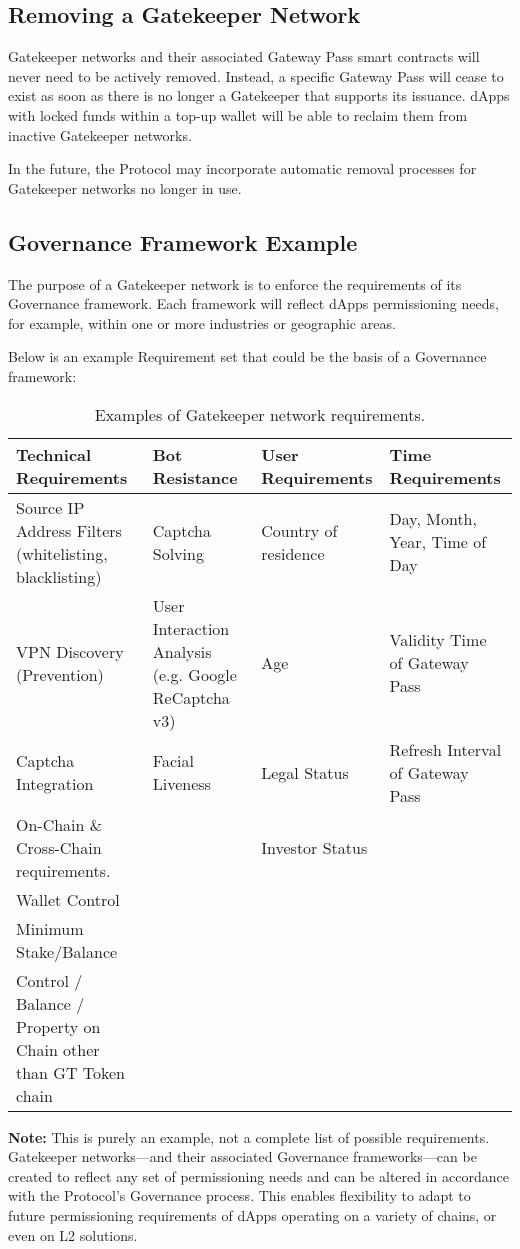 \subsection{Removing a Gatekeeper Network}
Gatekeeper networks and their associated Gateway Pass smart contracts will never need to be actively removed. Instead, a specific Gateway Pass will cease to exist as soon as there is no longer a Gatekeeper that supports its issuance. dApps with locked funds within a top-up wallet will be able to reclaim them from inactive Gatekeeper networks.

In the future, the Protocol may incorporate automatic removal processes for Gatekeeper networks no longer in use.

\subsection{Governance Framework Example}
The purpose of a Gatekeeper network is to enforce the requirements of its Governance framework. Each framework will reflect dApps permissioning needs, for example, within one or more industries or geographic areas.

Below is an example Requirement set that could be the basis of a Governance framework:
\clearpage
{ %
\renewcommand{\arraystretch}{2.0}
\begin{table}
\centering
\scriptsize
\begin{tabular}{@{}|p{}|p{}|p{}|p{}|@{}}
\hline
\textbf{Technical Requirements} & \textbf{Bot Resistance} & \textbf{User Requirements} & \textbf{Time Requirements} \\
\hline
Source IP Address Filters (whitelisting, blacklisting) & Captcha Solving & Country of residence & Day, Month, Year, Time of Day\\
VPN Discovery (Prevention) & User Interaction Analysis (e.g. Google ReCaptcha v3) & Age & Validity Time of Gateway Pass\\
Captcha Integration & Facial Liveness & Legal Status & Refresh Interval of Gateway Pass\\
On-Chain \& Cross-Chain requirements. & & Investor Status & \\
Wallet Control & & & \\
Minimum Stake/Balance & & & \\
Control / Balance / Property on Chain other than GT Token chain & & & \\
\hline
\end{tabular}
\caption{\label{tbl:gn-requirements} Examples of Gatekeeper network requirements.}
\end{table}

\textbf{Note:} This is purely an example, not a complete list of possible requirements. Gatekeeper networks—and their associated Governance frameworks—can be created to reflect any set of permissioning needs and can be altered in accordance with the Protocol’s Governance process. This enables flexibility to adapt to future permissioning requirements of dApps operating on a variety of chains, or even on L2 solutions.

}